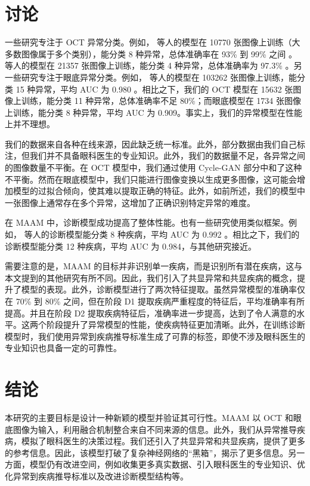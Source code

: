 \documentclass{article}
\begin{document}
	\begin{multicols}{2}
	\section{讨论}
	
	一些研究专注于 OCT 异常分类。例如，\citeauthor{leandro2023oct} 等人的模型在 10770 张图像上训练（大多数图像属于多个类别），能分类 8 种异常，总体准确率在 93\% 到 99\% 之间 \autocite{leandro2023oct}。\citeauthor{li2019deep} 等人的模型在 21357 张图像上训练，能分类 4 种异常，总体准确率为 97.3\% \autocite{li2019deep}。另一些研究专注于眼底异常分类。例如，\citeauthor{Son2023} 等人的模型在 103262 张图像上训练，能分类 15 种异常，平均 AUC 为 0.980 \autocite{Son2023}。相比之下，我们的 OCT 模型在 15632 张图像上训练，能分类 11 种异常，总体准确率不足 80\%；而眼底模型在 1734 张图像上训练，能分类 8 种异常，平均 AUC 为 0.909。事实上，我们的异常模型在性能上并不理想。
	
	我们的数据来自各种在线来源，因此缺乏统一标准。此外，部分数据由我们自己标注，但我们并不具备眼科医生的专业知识。此外，我们的数据量不足，各异常之间的图像数量不平衡。在 OCT 模型中，我们通过使用 Cycle-GAN 部分中和了这种不平衡。然而在眼底模型中，我们只能进行图像变换以生成更多图像，这可能会增加模型的过拟合倾向，使其难以提取正确的特征。此外，如前所述，我们的模型中一张图像上通常存在多个异常，这增加了正确识别特定异常的难度。
	
	\vspace{0.3cm}
	
	在 MAAM 中，诊断模型成功提高了整体性能。也有一些研究使用类似框架。例如，\citeauthor{Son2023} 等人的诊断模型能分类 8 种疾病，平均 AUC 为 0.992 \autocite{Son2023}。相比之下，我们的诊断模型能分类 12 种疾病，平均 AUC 为 0.984，与其他研究接近。
	
	需要注意的是，MAAM 的目标并非识别单一疾病，而是识别所有潜在疾病，这与本文提到的其他研究有所不同。因此，我们引入了共显异常和共显疾病的概念，提升了模型的表现。此外，诊断模型进行了两次特征提取。虽然异常模型的准确率仅在 70\% 到 80\% 之间，但在阶段 D1 提取疾病严重程度的特征后，平均准确率有所提高。并且在阶段 D2 提取疾病特征后，准确率进一步提高，达到了令人满意的水平。这两个阶段提升了异常模型的性能，使疾病特征更加清晰。此外，在训练诊断模型时，我们使用异常到疾病推导标准生成了可靠的标签，即使不涉及眼科医生的专业知识也具备一定的可靠性。
	
	\section{结论}
		
	本研究的主要目标是设计一种新颖的模型并验证其可行性。MAAM 以 OCT 和眼底图像为输入，利用融合机制整合来自不同来源的信息。此外，我们从异常推导疾病，模拟了眼科医生的决策过程。我们还引入了共显异常和共显疾病，提供了更多的参考信息。因此，该模型打破了复杂神经网络的“黑箱”，揭示了更多信息。另一方面，模型仍有改进空间，例如收集更多真实数据、引入眼科医生的专业知识、优化异常到疾病推导标准以及改进诊断模型结构等。
	
	\end{multicols}
	
\end{document}
